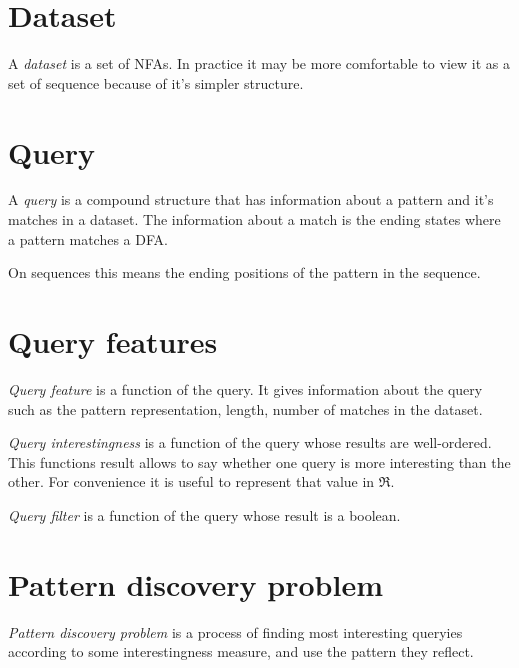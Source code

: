 \section{Dataset}

A \emph{dataset} is a set of NFAs. In practice it may be more comfortable
to view it as a set of sequence because of it's simpler structure.


\section{Query}

A \emph{query} is a compound structure that has information about a
pattern and it's matches in a dataset. The information about a
match is the ending states where a pattern matches a DFA.

On sequences this means the ending positions of the pattern 
in the sequence.


\section{Query features}

\emph{Query feature} is a function of the query. It gives 
information about the query such as the pattern representation, 
length, number of matches in the dataset.


\emph{Query interestingness} is a function of the query whose
results are well-ordered. This functions result allows to
say whether one query is more interesting than the other.
For convenience it is useful to represent that value in
$\Re$.


\emph{Query filter} is a function of the query whose result
is a boolean.


\section{Pattern discovery problem}

\emph{Pattern discovery problem} is a process of finding
most interesting queryies according to some 
interestingness measure, and use the pattern they reflect.